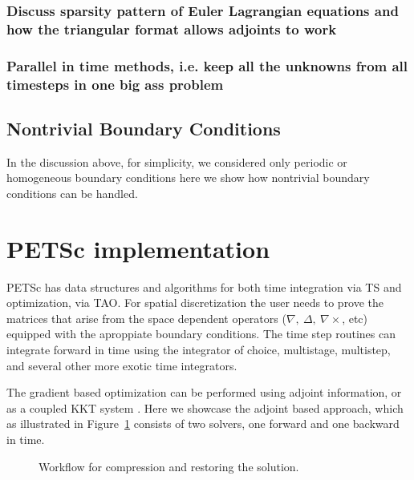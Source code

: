 \documentclass[10pt]{article}
\begin{document}
{\subsubsection{Discuss sparsity pattern of Euler Lagrangian equations and how the triangular format allows adjoints to work}

\subsubsection{Parallel in time methods, i.e. keep all the unknowns from all timesteps in one big ass problem}

\subsection{Nontrivial Boundary Conditions}

In the discussion above, for simplicity, we considered only periodic or homogeneous boundary conditions here we show how nontrivial boundary conditions can be handled. 

\section{PETSc implementation}

PETSc has data structures and algorithms for both time integration via TS and optimization, via TAO.
For spatial discretization the user needs to prove the matrices that arise from the space dependent operators ($\nabla,\ \Delta,\ \nabla \times$, etc) equipped with the aproppiate boundary conditions. The time step routines can integrate forward in time using the integrator of choice, multistage, multistep, and several other more exotic time integrators.

The gradient based optimization can be performed using adjoint information, or as a coupled KKT system \cite{Haber_2007}. Here we showcase the adjoint based approach, which as illustrated in Figure~\ref{fig:algorithm} consists of two solvers, one forward and one backward in time.

\begin{figure}
\begin{center}
\end{center}
 \caption{Workflow for compression and restoring the solution.} 
  \label{fig:algorithm}
\end{figure}
\lstset{language=C,numbers=left,
    stepnumber=5,
    showstringspaces=false,
    tabsize=2,
    breaklines=true,
    breakatwhitespace=true}
\begin{lstlisting}[caption=PETSc code for PDE constrained optimization via adjoints, label=codemat]


\end{lstlisting}}
\end{document}
